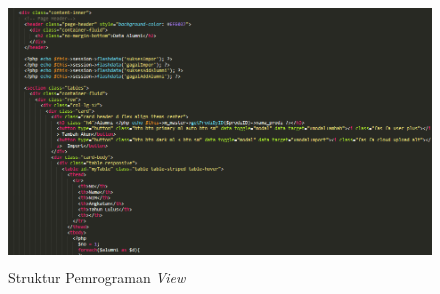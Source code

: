 \begin{figure}[H]
	\centering
	\includegraphics[width=14cm,height=7cm]{gambar/source_code/v_alumni}
	\caption{Struktur Pemrograman \textit{View}}
	\label{sc_vAlumni}
\end{figure}
